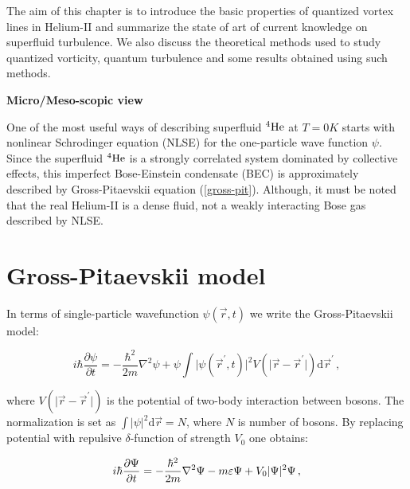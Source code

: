 The aim of this chapter is to introduce the basic properties of quantized vortex lines in Helium-II and summarize the state of art of current knowledge on superfluid turbulence. We also discuss the theoretical methods used to study quantized vorticity, quantum turbulence and some results obtained using such methods.


\newpage

{\Huge \bfseries Micro/Meso-scopic view}
\vspace{0.3cm}

One of the most useful ways of describing superfluid ${}^4\mathrm{He}$ at $T=0\unit{K}$ starts with nonlinear Schrodinger equation (NLSE) for the one-particle wave function $\psi$. Since the superfluid ${}^4\mathrm{He}$ is a strongly correlated system dominated by collective effects, this imperfect Bose-Einstein condensate (BEC) is approximately described by Gross-Pitaevskii equation (\ref{gross-pit}). Although, it must be noted that the real Helium-II is a dense fluid, not a weakly interacting Bose gas described by NLSE.


\section{Gross-Pitaevskii model}

In terms of single-particle wavefunction $\psi(\vec{r},t)$ we write the Gross-Pitaevskii model:

\begin{equation}
i \hbar \frac{\partial \psi}{\partial t} = - \frac{\hbar^2}{2m} \nabla^2 \psi
+ \psi \int \vert \psi(\vec{r}^{\prime},t) \vert^2 V(\vert \vec{r} - \vec{r}^{\prime} \vert)
\text{d}\vec{r}^{\prime}\,,
\label{gross-pit}
\end{equation}

where $V(\vert \vec{r} - \vec{r}^{\prime} \vert)$ is the potential of two-body interaction between bosons. The normalization is set as $\int \vert \psi \vert^2 \text{d}\vec{r} = N$, where $N$ is number of bosons. By replacing potential with repulsive $\delta$-function of strength $V_0$ one obtains:

\begin{equation}
i \hbar \frac{\partial \Psi}{\partial t} = - \frac{\hbar^2}{2m} \nabla^2 \Psi - m\varepsilon \Psi + V_0 \vert \Psi \vert^2 \Psi\,,
\label{GP}
\end{equation}

